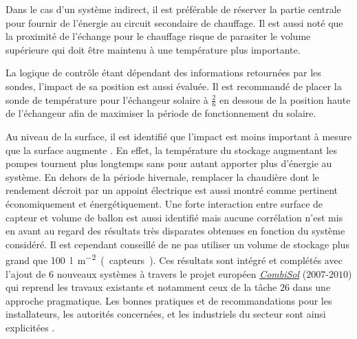 Dans le cas d’un système indirect, il est préférable de réserver la partie centrale
pour fournir de l’énergie au circuit secondaire de chauffage. Il est aussi noté que
la proximité de l’échange pour le chauffage risque de parasiter le volume supérieure
qui doit être maintenu à une température plus importante.

La logique de contrôle étant dépendant des informations retournées par les sondes,
l’impact de sa position est aussi évaluée. Il est recommandé de placer la sonde
de température pour l’échangeur solaire à $\frac{2}{6}$ en dessous de la position haute
de l’échangeur afin de maximiser la période de fonctionnement du solaire.

Au niveau de la surface, il est identifié que l’impact est moins important à mesure
que la surface augmente \parencite{Task26C2007}. En effet, la température du stockage augmentant les pompes
tournent plus longtemps sans pour autant apporter plus d’énergie au système. En dehors
de la période hivernale, remplacer la chaudière dont le rendement décroit par un appoint
électrique est aussi montré comme pertinent économiquement et énergétiquement.
Une forte interaction entre surface de capteur et volume de ballon est aussi identifié
mais aucune corrélation n’est mis en avant au regard des résultats très disparates
obtenues en fonction du système considéré. Il est cependant conseillé de ne pas utiliser
un volume de stockage plus grand que \SI{100}{\litre\per\metre\squared (capteurs)}.
Ces résultats sont intégré et complétés avec l’ajout de $6$ nouveaux systèmes à travers
le projet européen \href{http://www.combisol.eu/}{\textit{CombiSol}} ($2007$-$2010$) qui reprend
les travaux existants et notamment ceux de la tâche $26$ dans une approche pragmatique.
Les bonnes pratiques et de recommandations pour les installateurs, les autorités concernées,
et les industriels du secteur sont ainsi explicitées \parencite{Thuer2011}.

